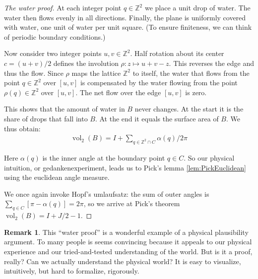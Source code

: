 \documentclass[a4paper]{amsart}
\numberwithin{equation}{section}
\theoremstyle{plain}
\theoremstyle{definition}
\newtheorem{remark}[theorem]{Remark}
\newcommand{\Z}{\mathbb{Z}}
\DeclareMathOperator{\vol}{vol}
\begin{document}
\begin{proof}[The water proof]
  At each integer point $q \in \Z^2$ we place a unit drop of water.
  The water then flows evenly in all directions.  Finally, the plane is
  uniformly covered with water, one unit of water per unit square.
  (To ensure finiteness, we can think of periodic boundary conditions.)

  Now consider two integer points $u,v \in \Z^2$.
  Half rotation about its center $c = (u+v)/2$
  defines the involution $\rho \colon z \mapsto u + v - z$.
  This reverses the edge and thus the flow.
  Since $\rho$ maps the lattice $\Z^2$ to itself,
  the water that flows from the point $q \in \Z^2$ over $[u,v]$ 
  is compensated by the water flowing from the point $\rho(q) \in \Z^2$ over $[u,v]$.
  The net flow over the edge $[u,v]$ is zero.
  
  This shows that the amount of water in $B$ never changes.
  At the start it is the share of drops that fall into $B$.
  At the end it equals the surface area of $B$.
  We thus obtain:
  \begin{align*}
    \vol_2(B) = I + \sum_{q \in \Z^2 \cap C} \alpha(q) / 2\pi
  \end{align*}

  Here $\alpha(q)$ is the inner angle at the boundary point $q \in C$.
  So our physical intuition, or gedankenexperiment, leads us to
  Pick's lemma \ref{lem:PickEuclidean} using the euclidean angle measure.

  We once again invoke Hopf's umlaufsatz:
  the sum of outer angles is $\sum_{q \in C} [ \pi - \alpha(q) ] = 2\pi$,
  so we arrive at Pick's theorem $\vol_2(B) = I + J/2 - 1$.
\end{proof}



\begin{remark}
  This “water proof” is a wonderful example
  of a physical plausibility argument.
  To many people is seems convincing
  because it appeals to our physical experience
  and our tried-and-tested understanding of the world.
  But is it a proof, really?
  Can we actually understand the physical world?
  It is easy to visualize, intuitively, but hard to formalize, rigorously.
\end{remark}
\end{document}
